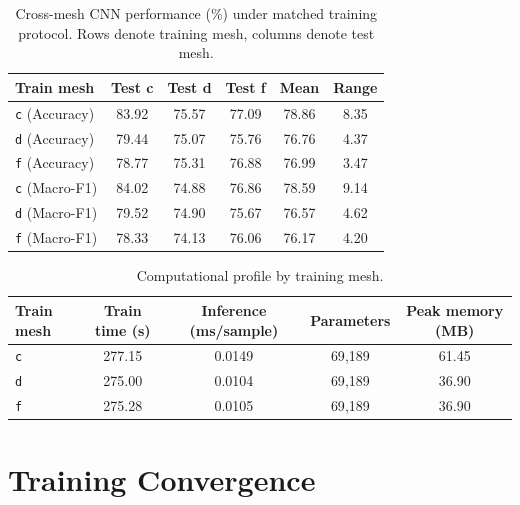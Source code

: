 \begin{table}[htbp]
\centering
\caption[Cross-mesh CNN performance]{Cross-mesh CNN performance (\%) under matched training protocol. Rows denote training mesh, columns denote test mesh.}
\label{tab:mesh-cross-matrix}
\small
\setlength{\tabcolsep}{6pt}
\renewcommand{\arraystretch}{1.12}
\begin{tabular}{@{}l c c c c c@{}}
\toprule
\textbf{Train mesh} & \textbf{Test c} & \textbf{Test d} & \textbf{Test f} & \textbf{Mean} & \textbf{Range} \\
\midrule
\texttt{c} (Accuracy) & 83.92 & 75.57 & 77.09 & 78.86 & 8.35 \\
\texttt{d} (Accuracy) & 79.44 & 75.07 & 75.76 & 76.76 & 4.37 \\
\texttt{f} (Accuracy) & 78.77 & 75.31 & 76.88 & 76.99 & 3.47 \\
\midrule
\texttt{c} (Macro-F1) & 84.02 & 74.88 & 76.86 & 78.59 & 9.14 \\
\texttt{d} (Macro-F1) & 79.52 & 74.90 & 75.67 & 76.57 & 4.62 \\
\texttt{f} (Macro-F1) & 78.33 & 74.13 & 76.06 & 76.17 & 4.20 \\
\bottomrule
\end{tabular}
\end{table}

\begin{table}[htbp]
\centering
\caption[Computational profile by training mesh]{Computational profile by training mesh.}
\label{tab:mesh-compute}
\small
\setlength{\tabcolsep}{7pt}
\renewcommand{\arraystretch}{1.12}
\begin{tabular}{@{}l c c c c@{}}
\toprule
\textbf{Train mesh} & \textbf{Train time (s)} & \textbf{Inference (ms/sample)} & \textbf{Parameters} & \textbf{Peak memory (MB)} \\
\midrule
\texttt{c} & 277.15 & 0.0149 & 69{,}189 & 61.45 \\
\texttt{d} & 275.00 & 0.0104 & 69{,}189 & 36.90 \\
\texttt{f} & 275.28 & 0.0105 & 69{,}189 & 36.90 \\
\bottomrule
\end{tabular}
\end{table}

\section{Training Convergence}
\label{app:training-curves}

